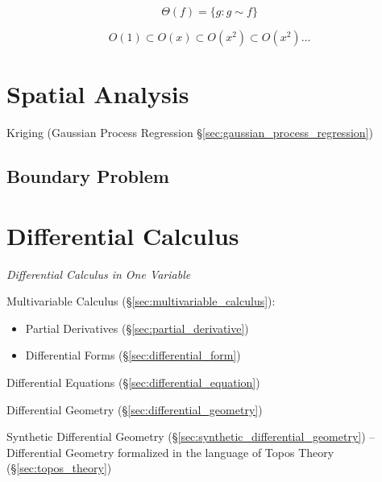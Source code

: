 \[
    \Theta(f) = \{ g : g \sim f \}
\]

\[
    O(1) \subset O(x) \subset O(x^2) \subset O(x^2) \ldots
\]



\section{Spatial Analysis}\label{sec:spatial_analysis}


Kriging (Gaussian Process Regression \S\ref{sec:gaussian_process_regression})



\subsection{Boundary Problem}\label{sec:boundary_problem}




\section{Differential Calculus}\label{sec:differential_calculus}

\emph{Differential Calculus in One Variable}

\fist Multivariable Calculus (\S\ref{sec:multivariable_calculus}):
\begin{itemize}
  \item Partial Derivatives (\S\ref{sec:partial_derivative})
  \item Differential Forms (\S\ref{sec:differential_form})
\end{itemize}

\fist Differential Equations (\S\ref{sec:differential_equation})

\fist Differential Geometry (\S\ref{sec:differential_geometry})

\fist Synthetic Differential Geometry
(\S\ref{sec:synthetic_differential_geometry}) --
Differential Geometry formalized in the language of Topos Theory
(\S\ref{sec:topos_theory})

